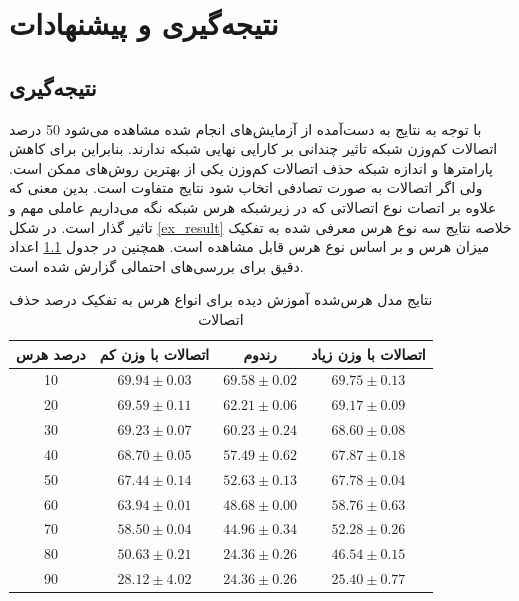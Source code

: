 \chapter{نتیجه‌گیری و پیشنهادات}
\thispagestyle{empty}

\section{نتیجه‌گیری}

با توجه به نتایج به دست‌آمده از آزمایش‌های انجام شده مشاهده می‌شود 50 درصد اتصالات کم‌وزن شبکه
تاثیر چندانی بر کارایی نهایی شبکه ندارند. بنابراین برای کاهش پارامتر‌ها و اندازه شبکه حذف اتصالات کم‌وزن یکی از بهترین روش‌های ممکن است. ولی اگر اتصالات به صورت تصادفی اتخاب شود نتایج متفاوت است. بدین معنی که علاوه بر اتصات نوع اتصالاتی که در زیرشبکه هرس شبکه نگه می‌داریم عاملی مهم و تاثیر گذار است. در شکل \ref{ex_result} خلاصه نتایج سه نوع هرس معرفی شده به تفکیک میزان هرس و بر اساس نوع هرس قابل مشاهده است. همچنین در جدول \ref{res_all} اعداد دقیق برای بررسی‌های احتمالی گزارش شده است.

\begin{table}[ht]
	\caption{نتایج مدل هرس‌شده آموزش دیده برای انواع هرس به تفکیک درصد حذف اتصالات}
	\label{res_all}
	\centering
	\onehalfspacing
	\begin{tabular}{|c|c|c|c|}
		\hline درصد هرس & اتصالات با وزن کم & رندوم & اتصالات با وزن زیاد\\ 
		\hline 10 & $69.94 \pm 0.03$ & $69.58 \pm 0.02$  &  $69.75 \pm 0.13$\\ 
		\hline 20 & $69.59 \pm 0.11$ & $62.21 \pm 0.06$  &  $69.17 \pm 0.09$\\ 
		\hline 30 & $69.23 \pm 0.07$ & $60.23 \pm 0.24$  &  $68.60 \pm 0.08$\\ 
		\hline 40 & $68.70 \pm 0.05$ & $57.49 \pm 0.62$  &  $67.87 \pm 0.18$\\ 
		\hline 50 & $67.44 \pm 0.14$ & $52.63 \pm 0.13$  &  $67.78 \pm 0.04$\\ 
		\hline 60 & $63.94 \pm 0.01$ & $48.68 \pm 0.00$  &  $58.76 \pm 0.63$\\ 
		\hline 70 & $58.50 \pm 0.04$ & $44.96 \pm 0.34$  &  $52.28 \pm 0.26$\\ 
		\hline 80 & $50.63 \pm 0.21$ & $24.36 \pm 0.26$  &  $46.54 \pm 0.15$\\ 
		\hline 90 & $28.12 \pm 4.02$ & $24.36 \pm 0.26$  &  $25.40 \pm 0.77$\\ 
		\hline 
	\end{tabular} 
\end{table}

